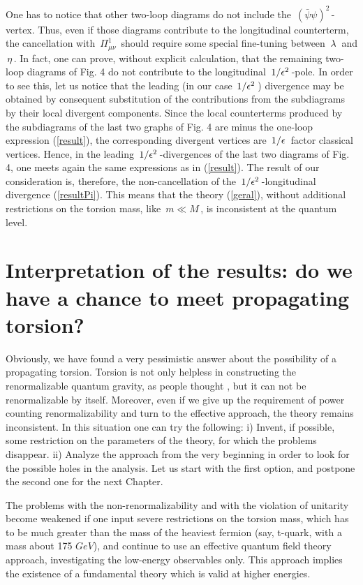 One has to notice that other two-loop
diagrams do not include the 
$\,({\bar \psi}\psi)^2\,$-vertex. Thus, even if those
diagrams contribute to the longitudinal counterterm,
the cancellation with $\,\Pi^1_{\mu\nu}\,$ should require
some special fine-tuning between $\,\lambda\,$ and $\,\eta\,$.
In fact, one can prove, without explicit calculation, that
the remaining two-loop diagrams of Fig. 4 
do not contribute to the longitudinal $\,1/\epsilon^2\,$-pole.
In order to see this, let us notice that the leading
(in our case  $\,1/\epsilon^2\,$) divergence may be obtained
by consequent substitution of the contributions from
the subdiagrams by their local divergent components.
Since the local counterterms produced by the
subdiagrams of the last two graphs of Fig. 4
are minus the one-loop expression
(\ref{result}), the corresponding divergent vertices
are $\,1/\epsilon\,$ factor classical vertices. Hence, in the
leading $\,1/\epsilon^2\,$-divergences of the last two 
diagrams of Fig. 4, one meets again the same expressions as
in (\ref{result}). The result of our consideration is, therefore,
the non-cancellation of the $\,1/\epsilon^2\,$-longitudinal
divergence (\ref{resultPi}). This means that the theory
(\ref{geral}), without additional restrictions
on the torsion mass, like $\,m \ll M\,$, is inconsistent at the
quantum level.

\section{Interpretation of the results: do we have a chance to meet
propagating torsion?}

Obviously, we have found a very pessimistic answer about the 
possibility of a
propagating torsion. Torsion is not only helpless in constructing 
the renormalizable quantum gravity, as people thought 
\cite{nev1,seznie}, but it can not be renormalizable by itself. 
Moreover, even if we give up the requirement of power counting
renormalizability and turn to the effective approach, the theory 
remains inconsistent. In this situation one can try the 
following: i) Invent, if possible, some restriction on the 
parameters of the theory, for which the problems disappear.
ii) Analyze the approach from the very beginning in order to 
look for the possible holes in the analysis. 
Let us start with the first option, and postpone the second one
for the next Chapter.

The problems with the non-renormalizability and with the
violation of unitarity become weakened if one input
severe restrictions on the torsion mass, which has to be much 
greater than the mass of the heaviest fermion (say, t-quark, 
with a mass about 175 $GeV$), and continue to use an effective 
quantum field theory approach, investigating 
the low-energy observables only. This approach implies the
existence of a fundamental theory which is valid at higher
energies. 

